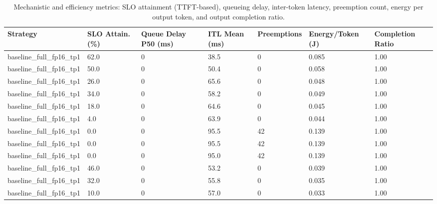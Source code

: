 \begin{table}
\caption{Mechanistic and efficiency metrics: SLO attainment (TTFT-based), queueing delay, inter-token latency, preemption count, energy per output token, and output completion ratio.}
\label{tab:efficiency}
\begin{tabular}{lllllll}
\toprule
Strategy & SLO Attain. (\%) & Queue Delay P50 (ms) & ITL Mean (ms) & Preemptions & Energy/Token (J) & Completion Ratio \\
\midrule
baseline\_full\_fp16\_tp1 & 62.0 & 0 & 38.5 & 0 & 0.085 & 1.00 \\
baseline\_full\_fp16\_tp1 & 50.0 & 0 & 50.4 & 0 & 0.058 & 1.00 \\
baseline\_full\_fp16\_tp1 & 26.0 & 0 & 65.6 & 0 & 0.048 & 1.00 \\
baseline\_full\_fp16\_tp1 & 34.0 & 0 & 58.2 & 0 & 0.049 & 1.00 \\
baseline\_full\_fp16\_tp1 & 18.0 & 0 & 64.6 & 0 & 0.045 & 1.00 \\
baseline\_full\_fp16\_tp1 & 4.0 & 0 & 63.9 & 0 & 0.044 & 1.00 \\
baseline\_full\_fp16\_tp1 & 0.0 & 0 & 95.5 & 42 & 0.139 & 1.00 \\
baseline\_full\_fp16\_tp1 & 0.0 & 0 & 95.5 & 42 & 0.139 & 1.00 \\
baseline\_full\_fp16\_tp1 & 0.0 & 0 & 95.0 & 42 & 0.139 & 1.00 \\
baseline\_full\_fp16\_tp1 & 46.0 & 0 & 53.2 & 0 & 0.039 & 1.00 \\
baseline\_full\_fp16\_tp1 & 32.0 & 0 & 55.8 & 0 & 0.035 & 1.00 \\
baseline\_full\_fp16\_tp1 & 10.0 & 0 & 57.0 & 0 & 0.033 & 1.00 \\
\bottomrule
\end{tabular}
\end{table}

